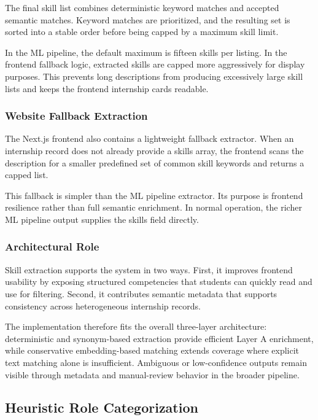 The final skill list combines deterministic keyword matches and accepted semantic matches. Keyword matches are prioritized, and the resulting set is sorted into a stable order before being capped by a maximum skill limit.

In the ML pipeline, the default maximum is fifteen skills per listing. In the frontend fallback logic, extracted skills are capped more aggressively for display purposes. This prevents long descriptions from producing excessively large skill lists and keeps the frontend internship cards readable.

\subsubsection*{Website Fallback Extraction}

The Next.js frontend also contains a lightweight fallback extractor. When an internship record does not already provide a skills array, the frontend scans the description for a smaller predefined set of common skill keywords and returns a capped list.

This fallback is simpler than the ML pipeline extractor. Its purpose is frontend resilience rather than full semantic enrichment. In normal operation, the richer ML pipeline output supplies the skills field directly.

\subsubsection*{Architectural Role}

Skill extraction supports the system in two ways. First, it improves frontend usability by exposing structured competencies that students can quickly read and use for filtering. Second, it contributes semantic metadata that supports consistency across heterogeneous internship records.

The implementation therefore fits the overall three-layer architecture: deterministic and synonym-based extraction provide efficient Layer A enrichment, while conservative embedding-based matching extends coverage where explicit text matching alone is insufficient. Ambiguous or low-confidence outputs remain visible through metadata and manual-review behavior in the broader pipeline.

\subsection{Heuristic Role Categorization}

